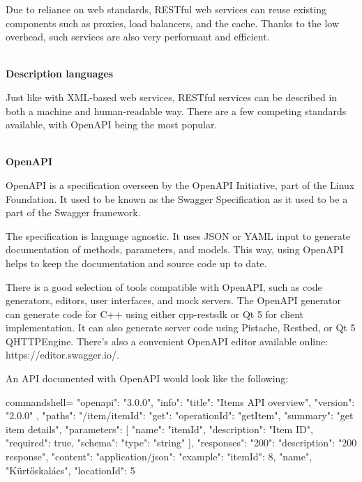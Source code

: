 Due to reliance on web standards, RESTful web services can reuse existing components such as proxies, load balancers, and the cache. Thanks to the low overhead, such services are also very performant and efficient.

\hspace*{\fill} \\ %
\noindent
\textbf{Description languages}

Just like with XML-based web services, RESTful services can be described in both a machine and human-readable way. There are a few competing standards available, with OpenAPI being the most popular.

\hspace*{\fill} \\ %
\noindent
\textbf{OpenAPI}

OpenAPI is a specification overseen by the OpenAPI Initiative, part of the Linux Foundation. It used to be known as the Swagger Specification as it used to be a part of the Swagger framework.

The specification is language agnostic. It uses JSON or YAML input to generate documentation of methods, parameters, and models. This way, using OpenAPI helps to keep the documentation and source code up to date.

There is a good selection of tools compatible with OpenAPI, such as code generators, editors, user interfaces, and mock servers. The OpenAPI generator can generate code for C++ using either cpp-restsdk or Qt 5 for client implementation. It can also generate server code using Pistache, Restbed, or Qt 5 QHTTPEngine. There's also a convenient OpenAPI editor available online: https://editor.swagger.io/.

An API documented with OpenAPI would look like the following:

\begin{tcblisting}{commandshell={}}
{
  "openapi": "3.0.0",
  "info": {
    "title": "Items API overview",
    "version": "2.0.0"
  },
  "paths": {
    "/item/{itemId}": {
      "get": {
        "operationId": "getItem",
        "summary": "get item details",
        "parameters": [
          "name": "itemId",
          "description": "Item ID",
          "required": true,
          "schema": {
            "type": "string"
        }
      ],
      "responses": {
        "200": {
          "description": "200 response",
            "content": {
              "application/json": {
                "example": {
                  "itemId": 8,
                  "name", "Kürtőskalács",
                  "locationId": 5
                }
              }
            }
          }
        }
      }
    }
  }
}
\end{tcblisting}


